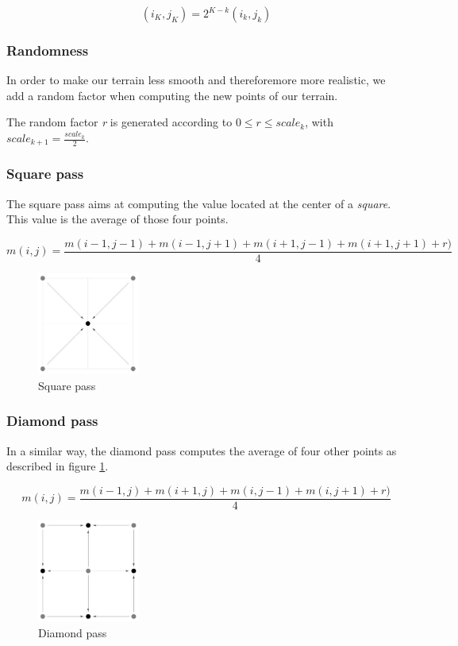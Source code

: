 \begin{equation}
(i_K, j_K) = 2^{K - k} (i_k, j_k)
\end{equation}

\subsubsection{Randomness}
In order to make our terrain less smooth and thereforemore more realistic, we add a random factor when computing the new points of our terrain.

The random factor \textit{r} is generated according to $0 \leq r \leq scale_k$, with $scale_{k+1} = \frac{scale_k}{2}$.


\subsubsection{Square pass}
The square pass aims at computing the value located at the center of a \textit{square}. This value is the average of those four points.

\begin{equation}
m(i, j) = \frac{m(i-1, j-1) + m(i-1, j+1) + m(i+1, j-1) + m(i+1, j+1) + r)}{4}
\end{equation}

\begin{figure}[H]
\centering
\includegraphics[width=0.3\textwidth]{img/ds_square.jpg}
\caption{Square pass}
\end{figure}

\subsubsection{Diamond pass}
In a similar way, the diamond pass computes the average of four other points as described in figure \ref{fig:ds_diamond}.

\begin{equation}
m(i, j) = \frac{m(i-1, j) + m(i+1, j) + m(i, j-1) + m(i, j+1) + r)}{4}
\end{equation}

\begin{figure}[H]
\centering
\includegraphics[width=0.3\textwidth]{img/ds_diamond.jpg}
\caption{Diamond pass}
\label{fig:ds_diamond}
\end{figure}


